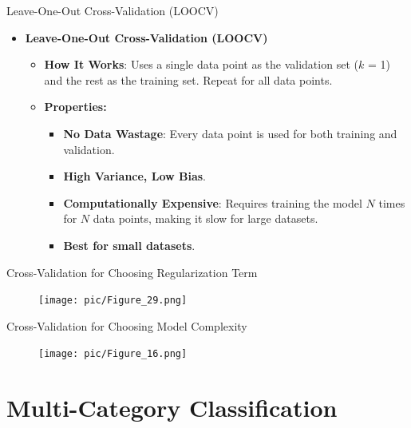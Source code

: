 \documentclass[serif, aspectratio=169]{beamer}
\begin{document}
\begin{frame}{Leave-One-Out Cross-Validation (LOOCV)}
    \begin{itemize}
        \item \textbf{Leave-One-Out Cross-Validation (LOOCV)}
            \medskip
            \begin{itemize}\itemsep1em
            \item \justifying \textbf{How It Works}:
            Uses a single data point as the validation set ($k$ = 1) and the rest as the training set. Repeat for all data points.
            \item \textbf{Properties:}
            \smallskip
            \begin{itemize}\itemsep.5em
                \item \textbf{No Data Wastage}:
                Every data point is used for both training and validation.
                \item \textbf{High Variance, Low Bias}.
                \item \justifying \textbf{Computationally Expensive}: 
                Requires training the model $N$ times for $N$ data points, making it slow for large datasets.
                \item \textbf{Best for small datasets}.
            \end{itemize}
        \end{itemize}
    \end{itemize}
\end{frame}

\begin{frame}{Cross-Validation for Choosing Regularization Term}
    \begin{figure}
        \centering
        \texttt{[image: pic/Figure\_29.png]}
    \end{figure}
\end{frame}

\begin{frame}{Cross-Validation for Choosing Model Complexity}
    \begin{figure}
        \centering
        \texttt{[image: pic/Figure\_16.png]}
    \end{figure}
\end{frame}

\section{Multi-Category Classification}
\end{document}
